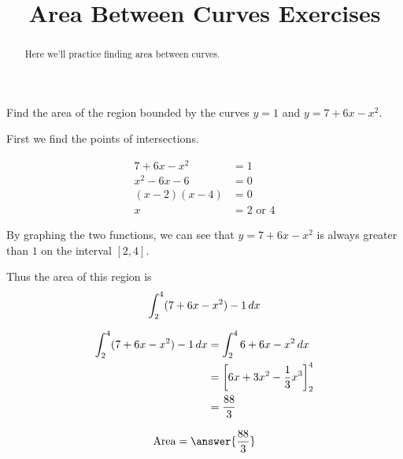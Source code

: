 \documentclass[handout]{ximera}
\title[Exercises:]{Area Between Curves Exercises}
\begin{document}
\begin{abstract}
  Here we'll practice finding area between curves.
\end{abstract}
\maketitle

\begin{exercise}
Find the area of the region bounded by the curves $y = 1$ and $y =7+6x-x^2$.

\begin{hint}
	First we find the points of intersections.
	
	\begin{align*}
	7+6x-x^2 &= 1\\
	x^2-6x-6 &=0\\
	(x-2)(x-4) &=0\\
	x &= 2 \textrm{ or  }4
	\end{align*}
\end{hint}

\begin{hint}
	By graphing the two functions, we can see that $y =7+6x-x^2$ is always greater than $1$ on the interval $[2,4]$.
\end{hint}

\begin{hint}
	Thus the area of this region is
	\[
	\int_2^4 (7+6x-x^2) - 1 \mathop{}\!d x
	\]
\end{hint}

\begin{hint}
	\begin{align*}
		\int_2^4 (7+6x-x^2) - 1 \mathop{}\!d x &= \int_2^4 6+6x-x^2 \mathop{}\!d x\\
		&= \bigg[ 6x+3x^2-\frac{1}{3}x^3 \bigg]_2^4\\
		&= \frac{88}{3}
	\end{align*}
\end{hint}

	\[
		\textrm{Area} = \answer{\frac{88}{3}}
	\]

\end{exercise}
\end{document}
